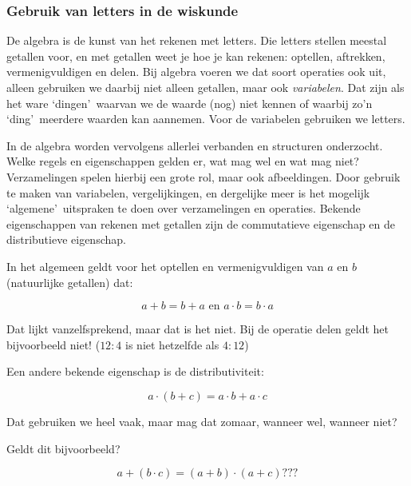 \subsubsection{Gebruik van letters in de wiskunde}

De algebra is de kunst van het rekenen met letters. Die letters stellen
meestal getallen voor, en met getallen weet je hoe je kan rekenen:
optellen, aftrekken, vermenigvuldigen en delen. Bij algebra voeren
we dat soort operaties ook uit, alleen gebruiken we daarbij niet alleen
getallen, maar ook \emph{variabelen}. Dat zijn als het ware \textquoteleft dingen\textquoteright \
waarvan we de waarde (nog) niet kennen of waarbij zo'n \textquoteleft ding\textquoteright \  meerdere
waarden kan aannemen. Voor de variabelen gebruiken we letters.

In de algebra worden vervolgens allerlei verbanden en structuren
onderzocht. Welke regels en eigenschappen gelden er, wat mag wel en
wat mag niet? Verzamelingen spelen hierbij een grote rol, maar ook
afbeeldingen. Door gebruik te maken van variabelen, vergelijkingen,
en dergelijke meer is het mogelijk \textquoteleft algemene\textquoteright \  uitspraken te doen over
verzamelingen en operaties. Bekende eigenschappen van rekenen met
getallen zijn de commutatieve eigenschap en de distributieve eigenschap.

\begin{voorbeeld}
	In het algemeen geldt voor het optellen en vermenigvuldigen
van $a$ en $b$ (natuurlijke getallen) dat:

\begin{equation*}
a + b = b + a \text{ en } a \cdot b = b \cdot a
\end{equation*}

\end{voorbeeld}

Dat lijkt vanzelfsprekend, maar dat is het niet. Bij de operatie delen
geldt het bijvoorbeeld niet! ($12:4$ is niet hetzelfde als $4:12$)

Een andere bekende eigenschap is de distributiviteit:

\begin{equation*}
a \cdot (b + c) = a \cdot b + a \cdot c
\end{equation*}

Dat gebruiken we heel vaak, maar mag dat zomaar, wanneer wel, wanneer
niet?

Geldt dit bijvoorbeeld?

\begin{equation*}
a + (b \cdot c) = (a + b) \cdot (a + c) ???
\end{equation*}





